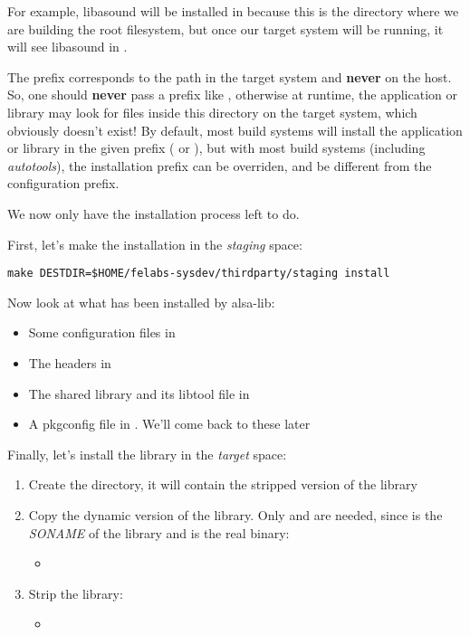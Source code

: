 For example, libasound will be installed in
 because this is
the directory where we are building the root filesystem, but once our
target system will be running, it will see libasound in
.

The prefix corresponds to the path in the target system and {\bf
  never} on the host. So, one should {\bf never} pass a prefix like
, otherwise at
runtime, the application or library may look for files inside this
directory on the target system, which obviously doesn't exist! By
default, most build systems will install the application or library in
the given prefix ( or ), but with most
build systems (including {\em autotools}), the installation prefix can
be overriden, and be different from the configuration prefix.

We now only have the installation process left to do.

First, let's make the installation in the {\em staging} space:
\begin{verbatim}
make DESTDIR=$HOME/felabs-sysdev/thirdparty/staging install
\end{verbatim}

Now look at what has been installed by alsa-lib:
\begin{itemize}
\item Some configuration files in 
\item The headers in 
\item The shared library and its libtool file in 
\item A pkgconfig file in . We'll come back
  to these later
\end{itemize}

Finally, let's install the library in the {\em target} space:

\begin{enumerate}
\item Create the  directory, it will contain the
  stripped version of the library
\item Copy the dynamic version of the library. Only
   and  are needed,
  since  is the {\em SONAME} of the library and
   is the real binary:
  \begin{itemize}
  \item {}
  \end{itemize}
\item Strip the library:
  \begin{itemize}
  \item {}
  \end{itemize}
\end{enumerate}

